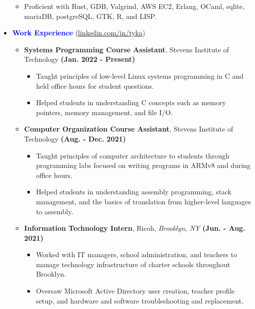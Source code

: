 \documentclass[11pt]{article}
\begin{document}
\begin{flushleft}
\begin{itemize}
\begin{itemize}
            \item Proficient with Rust, GDB, Valgrind, AWS EC2, Erlang, OCaml, sqlite, mariaDB, postgreSQL, GTK, R, and LISP.
        \end{itemize}
    \item[] \Large \textcolor{blue}{\textbf{Work Experience}} (\href{https://linkedin.com/in/tyka}{linkedin.com/in/tyka}) \normalsize
        \begin{itemize}
            \item \textbf{Systems Programming Course Assistant}, Stevens Institute of Technology \hfill{\textbf{(Jan. 2022 - Present)}}
                \begin{itemize}
                    \item Taught principles of low-level Linux systems programming in C and held office hours for student questions.
                    \item Helped students in understanding C concepts such as memory pointers, memory management, and file I/O.
                \end{itemize}
            \item \textbf{Computer Organization Course Assistant}, Stevens Institute of Technology \hfill{\textbf{(Aug. - Dec. 2021)}}
                \begin{itemize}
                    \item Taught principles of computer architecture to students through programming labs focused on writing programs in ARMv8 and during office hours.
                    \item Helped students in understanding assembly programming, stack management, and the basics of translation from higher-level languages to assembly.
                \end{itemize}
            \item \textbf{Information Technology Intern}, Ricoh, \textit{Brooklyn, NY} \hfill{\textbf{(Jun. - Aug. 2021)}}
                \begin{itemize}
                    \item Worked with IT managers, school administration, and teachers to manage technology infrastructure of charter schools throughout Brooklyn.
                    \item Oversaw Microsoft Active Directory user creation, teacher profile setup, and hardware and software troubleshooting and replacement.
                \end{itemize}
        \end{itemize}

\end{itemize}
\end{flushleft}
\end{document}
